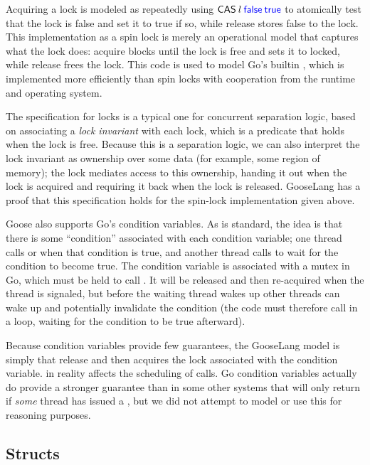 Acquiring a lock is modeled as repeatedly using
$\mathsf{CAS} \: l \: \mathsf{\textcolor{blue}{false}} \: \mathsf{\textcolor{blue}{true}}$ to
atomically test that the lock is false and set it to true if so, while release
stores false to the lock. This implementation as a spin lock is merely an
operational model that captures what the lock does: acquire blocks until the
lock is free and sets it to locked, while release frees the lock. This code is
used to model Go's builtin , which is implemented more
efficiently than spin locks with cooperation from the runtime and operating
system.

The specification for locks is a typical one for concurrent separation logic,
based on associating a \emph{lock invariant} with each lock, which is a predicate that holds when the lock
is free. Because this is a separation logic, we can also interpret the lock
invariant as ownership over some data (for example, some region of memory); the
lock mediates access to this ownership, handing it out when the lock is acquired
and requiring it back when the lock is released. GooseLang has a proof that this
specification holds for the spin-lock implementation given above.

Goose also supports Go's condition variables. As is standard, the idea is that
there is some ``condition'' associated with each condition variable; one thread
calls  or  when that condition is true, and another
thread calls  to wait for the condition to become true. The condition
variable is associated with a mutex in Go, which must be held to call
. It will be released and then re-acquired when the thread is
signaled, but before the waiting thread wakes up other threads can wake up and
potentially invalidate the condition (the code must therefore call 
in a loop, waiting for the condition to be true afterward).

Because condition variables provide few guarantees, the GooseLang model is
simply that  release and then acquires the lock associated with the
condition variable.  in reality affects the scheduling of
 calls. Go condition variables actually do provide a stronger
guarantee than in some other systems that  will only return if
\emph{some} thread has issued a , but we did not attempt to model
or use this for reasoning purposes.

\subsection{Structs}
\label{sec:goose:structs}

